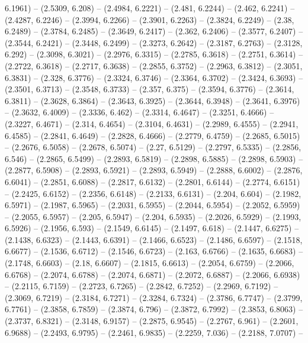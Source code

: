 {  6.1961) -- (2.5309, 6.208) -- (2.4984, 6.2221) -- (2.481, 6.2244) -- (2.462, 
  6.2241) -- (2.4287, 6.2246) -- (2.3994, 6.2266) -- (2.3901, 6.2263) -- 
  (2.3824, 6.2249) -- (2.38, 6.2489) -- (2.3784, 6.2485) -- (2.3649, 6.2417) -- 
  (2.362, 6.2406) -- (2.3577, 6.2407) -- (2.3544, 6.2421) -- (2.3448, 6.2499) --
   (2.3273, 6.2642) -- (2.3187, 6.2763) -- (2.3128, 6.292) -- (2.3098, 6.3021) 
  -- (2.2976, 6.3315) -- (2.2785, 6.3618) -- (2.2751, 6.3614) -- (2.2722, 
  6.3618) -- (2.2717, 6.3638) -- (2.2855, 6.3752) -- (2.2963, 6.3812) -- 
  (2.3051, 6.3831) -- (2.328, 6.3776) -- (2.3324, 6.3746) -- (2.3364, 6.3702) --
   (2.3424, 6.3693) -- (2.3501, 6.3713) -- (2.3548, 6.3733) -- (2.357, 6.375) --
   (2.3594, 6.3776) -- (2.3614, 6.3811) -- (2.3628, 6.3864) -- (2.3643, 6.3925) 
  -- (2.3644, 6.3948) -- (2.3641, 6.3976) -- (2.3632, 6.4009) -- (2.3336, 6.462)
   -- (2.3314, 6.4647) -- (2.3251, 6.4666) -- (2.3227, 6.4671) -- (2.314, 
  6.4654) -- (2.3104, 6.4631) -- (2.2989, 6.4555) -- (2.2941, 6.4585) -- 
  (2.2841, 6.4649) -- (2.2828, 6.4666) -- (2.2779, 6.4759) -- (2.2685, 6.5015) 
  -- (2.2676, 6.5058) -- (2.2678, 6.5074) -- (2.27, 6.5129) -- (2.2797, 6.5335) 
  -- (2.2856, 6.546) -- (2.2865, 6.5499) -- (2.2893, 6.5819) -- (2.2898, 6.5885)
   -- (2.2898, 6.5903) -- (2.2877, 6.5908) -- (2.2893, 6.5921) -- (2.2893, 
  6.5949) -- (2.2888, 6.6002) -- (2.2876, 6.6041) -- (2.2851, 6.6088) -- 
  (2.2817, 6.6132) -- (2.2801, 6.6144) -- (2.2774, 6.6151) -- (2.2425, 6.6152) 
  -- (2.2356, 6.6148) -- (2.2133, 6.6131) -- (2.204, 6.604) -- (2.1982, 6.5971) 
  -- (2.1987, 6.5965) -- (2.2031, 6.5955) -- (2.2044, 6.5954) -- (2.2052, 
  6.5959) -- (2.2055, 6.5957) -- (2.205, 6.5947) -- (2.204, 6.5935) -- (2.2026, 
  6.5929) -- (2.1993, 6.5926) -- (2.1956, 6.593) -- (2.1549, 6.6145) -- (2.1497,
   6.618) -- (2.1447, 6.6275) -- (2.1438, 6.6323) -- (2.1443, 6.6391) -- 
  (2.1466, 6.6523) -- (2.1486, 6.6597) -- (2.1518, 6.6677) -- (2.1536, 6.6712) 
  -- (2.1546, 6.6723) -- (2.163, 6.6766) -- (2.1635, 6.6683) -- (2.1748, 6.6603)
   -- (2.18, 6.6607) -- (2.1815, 6.6613) -- (2.2054, 6.6759) -- (2.2066, 6.6768)
   -- (2.2074, 6.6788) -- (2.2074, 6.6871) -- (2.2072, 6.6887) -- (2.2066, 
  6.6938) -- (2.2115, 6.7159) -- (2.2723, 6.7265) -- (2.2842, 6.7252) -- 
  (2.2969, 6.7192) -- (2.3069, 6.7219) -- (2.3184, 6.7271) -- (2.3284, 6.7324) 
  -- (2.3786, 6.7747) -- (2.3799, 6.7761) -- (2.3858, 6.7859) -- (2.3874, 6.796)
   -- (2.3872, 6.7992) -- (2.3853, 6.8063) -- (2.3737, 6.8321) -- (2.3148, 
  6.9157) -- (2.2875, 6.9545) -- (2.2767, 6.961) -- (2.2601, 6.9688) -- (2.2493,
   6.9795) -- (2.2461, 6.9835) -- (2.2259, 7.036) -- (2.2188, 7.0707) -- 
}
